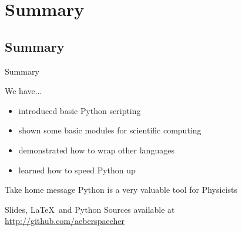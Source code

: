 \section{Summary}

\subsection{Summary}

\begin{frame}{Summary}

We have...

\begin{itemize}
	\item introduced basic Python scripting
	\item shown some basic modules for scientific computing
	\item demonstrated how to wrap other languages
	\item learned how to speed Python up
\end{itemize}

\begin{alertbbox}{Take home message}
Python is a very valuable tool for Physicists
\end{alertbbox}

Slides, \LaTeX~and Python Sources available at\\
\url{http://github.com/aeberspaecher}

\end{frame}
